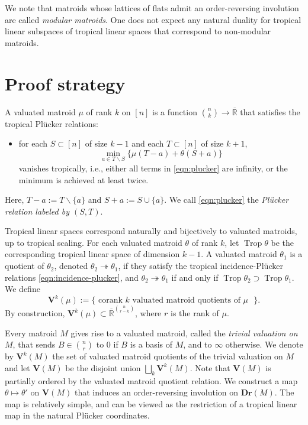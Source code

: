 \documentclass{article}
\theoremstyle{definition}
\newcommand{\onto}{\twoheadrightarrow}
\newcommand{\Rbar}{\overline{\mathbb{R}}}
\newcommand{\Trop}{\operatorname{Trop}}
\newcommand{\nk}[2]{\binom{#1}{#2}}
\newcommand{\Dr}{\mathbf{Dr}}
\newcommand{\bV}{\mathbf V}
\begin{document}
We note that matroids whose lattices of flats admit an order-reversing involution are called \emph{modular matroids}. One does not expect any natural duality for tropical linear subspaces of tropical linear spaces that correspond to non-modular matroids. 




\medskip

\section{Proof strategy}
A valuated matroid $\mu$ of rank $k$ on $[n]$ is a function $\nk{n}{k}\to \Rbar$ that satisfies the tropical Plücker relations:
\begin{itemize}
    \item for each $S\subset [n]$ of size $k-1$ and each $T\subset [n]$ of size $k+1$, 
\begin{equation}\label{eqn:plucker}
    \min_{a\in T\smallsetminus S}\{\mu(T-a )+\theta(S+a)\}
\end{equation}
vanishes tropically, i.e., either all terms in \eqref{eqn:plucker} are infinity, or the minimum is achieved at least twice.
\end{itemize}
Here, $T-a:=T\smallsetminus\{a\}$ and $S+a:=S\cup\{a\}$. We call \eqref{eqn:plucker} the \emph{Pl\"ucker relation labeled by $(S,T)$}.

Tropical linear spaces correspond naturally and bijectively to valuated matroids, up to tropical scaling. For each valuated matroid $\theta$ of rank $k$, let $\Trop\theta$ be the corresponding tropical linear space of dimension $k-1$. A valuated matroid $\theta_1$ is a quotient of $\theta_2$, denoted $\theta_2\onto \theta_1$, if they satisfy the tropical incidence-Plücker relations \eqref{eqn:incidence-plucker}, and $\theta_2\onto\theta_1$ if and only if $\Trop\theta_2\supset \Trop\theta_1$. We define 
\[\bV^k(\mu):=\{\text{ corank $k$ valuated matroid quotients of $\mu$ }\}.\]
By construction, $\bV^k(\mu)\subset \Rbar^{\nk{n}{r-k}}$, where $r$ is the rank of $\mu$. 

Every matroid $M$ gives rise to a valuated matroid, called the \textit{trivial valuation on $M$}, that sends $B\in \nk{n}{r}$ to 0 if $B$ is a basis of $M$, and to $\infty$ otherwise. We denote by $\bV^k(M)$ the set of valuated matroid quotients of the trivial valuation on $M$ and let $\bV(M)$ be the disjoint union $\bigsqcup_k\bV^k(M)$. Note that $\bV(M)$ is partially ordered by the valuated matroid quotient relation.  We construct a map $\theta\mapsto\theta'$ on $\bV(M)$ that induces an order-reversing involution on $\Dr(M)$. The map is relatively simple, and can be viewed as the restriction of a tropical linear map in the natural Pl\"ucker coordinates.
\end{document}
